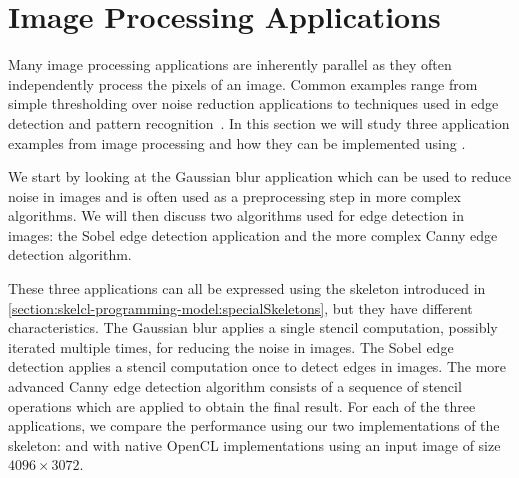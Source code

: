 \section{Image Processing Applications}
\label{sec:imageProcessing}
Many image processing applications are inherently parallel as they often independently process the pixels of an image.
Common examples range from simple thresholding over noise reduction applications to techniques used in edge detection and pattern recognition~\cite{Umbaugh1997}.
In this section we will study three application examples from image processing and how they can be implemented using \SkelCL.

We start by looking at the Gaussian blur application which can be used to reduce noise in images and is often used as a preprocessing step in more complex algorithms.
We will then discuss two algorithms used for edge detection in images:
the Sobel edge detection application and the more complex Canny edge detection algorithm.

These three applications can all be expressed using the \stencil skeleton introduced in \autoref{section:skelcl-programming-model:specialSkeletons}, but they have different characteristics.
The Gaussian blur applies a single stencil computation, possibly iterated multiple times, for reducing the noise in images.
The Sobel edge detection applies a stencil computation once to detect edges in images.
The more advanced Canny edge detection algorithm consists of a sequence of stencil operations which are applied to obtain the final result.
For each of the three applications, we compare the performance using our two implementations of the \stencil skeleton:
 and  with native OpenCL implementations using an input image of size $4096 \times 3072$.










